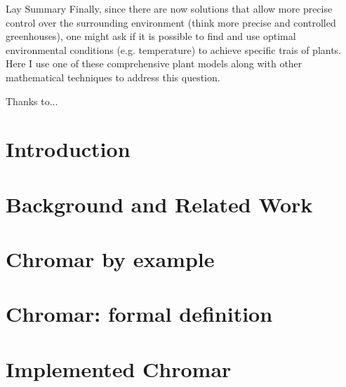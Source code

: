 \documentclass[phd, logo, twoside]{infthesis}
\newcommand{\eg}{e.g.\xspace}
\begin{document}
\begin{preliminary}
\begin{frontenv}{Lay Summary}{\LARGE}
    Finally, since there are now solutions that allow more precise control over
    the surrounding environment (think more precise and controlled greenhouses),
    one might ask if it is possible to find and use optimal environmental
    conditions (\eg temperature) to achieve specific trais of plants. Here I use
    one of these comprehensive plant models along with other mathematical
    techniques to address this question.
\end{frontenv}\newpage

  \begin{acknowledgements}
Thanks to...
    \end{acknowledgements}

\standarddeclaration


\tableofcontents


\end{preliminary}

\chapter{Introduction}
\label{chp:intro}


\chapter{Background and Related Work}
\label{chp:relWork}


\chapter{Chromar by example}
\label{chp:chromarEx}


\chapter{Chromar: formal definition}
\label{chp:chromarForm}


\chapter{Implemented Chromar}
\label{chp:chromarImpl}

\end{document}
